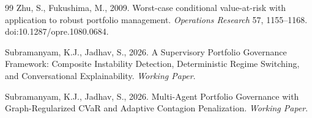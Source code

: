\documentclass[11pt]{article}
\begin{document}
\begin{thebibliography}{99}
Zhu, S., Fukushima, M., 2009. Worst-case conditional value-at-risk with application to robust portfolio management. \textit{Operations Research} 57, 1155--1168. doi:10.1287/opre.1080.0684.

Subramanyam, K.J., Jadhav, S., 2026. A Supervisory Portfolio Governance Framework: Composite Instability Detection, Deterministic Regime Switching, and Conversational Explainability. \textit{Working Paper}.

Subramanyam, K.J., Jadhav, S., 2026. Multi-Agent Portfolio Governance with Graph-Regularized CVaR and Adaptive Contagion Penalization. \textit{Working Paper}.

\end{thebibliography}
\normalsize

\clearpage
\appendix
{}
\renewcommand{\thepage}{A\arabic{page}}
\setcounter{page}{1}
\setcounter{table}{0}
\renewcommand{\thetable}{A.\arabic{table}}
\setcounter{figure}{0}
\renewcommand{\thefigure}{A.\arabic{figure}}

\end{document}
